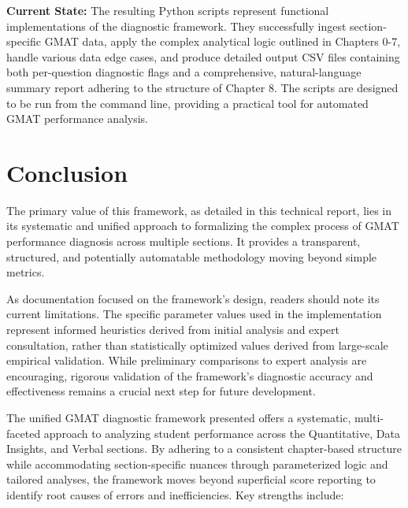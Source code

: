 \documentclass{article}
\begin{document}
\textbf{Current State:} The resulting Python scripts represent functional implementations of the diagnostic framework. They successfully ingest section-specific GMAT data, apply the complex analytical logic outlined in Chapters 0-7, handle various data edge cases, and produce detailed output CSV files containing both per-question diagnostic flags and a comprehensive, natural-language summary report adhering to the structure of Chapter 8. The scripts are designed to be run from the command line, providing a practical tool for automated GMAT performance analysis.

\section{Conclusion}

The primary value of this framework, as detailed in this technical report, lies in its systematic and unified approach to formalizing the complex process of GMAT performance diagnosis across multiple sections. It provides a transparent, structured, and potentially automatable methodology moving beyond simple metrics.

As documentation focused on the framework's design, readers should note its current limitations. The specific parameter values used in the implementation represent informed heuristics derived from initial analysis and expert consultation, rather than statistically optimized values derived from large-scale empirical validation. While preliminary comparisons to expert analysis are encouraging, rigorous validation of the framework's diagnostic accuracy and effectiveness remains a crucial next step for future development.

The unified GMAT diagnostic framework presented offers a systematic, multi-faceted approach to analyzing student performance across the Quantitative, Data Insights, and Verbal sections. By adhering to a consistent chapter-based structure while accommodating section-specific nuances through parameterized logic and tailored analyses, the framework moves beyond superficial score reporting to identify root causes of errors and inefficiencies. Key strengths include:
\end{document}
